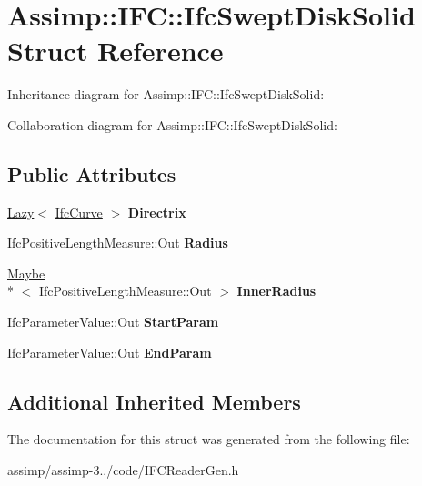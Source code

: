 \hypertarget{struct_assimp_1_1_i_f_c_1_1_ifc_swept_disk_solid}{\section{Assimp\+:\+:I\+F\+C\+:\+:Ifc\+Swept\+Disk\+Solid Struct Reference}
\label{struct_assimp_1_1_i_f_c_1_1_ifc_swept_disk_solid}
}


Inheritance diagram for Assimp\+:\+:I\+F\+C\+:\+:Ifc\+Swept\+Disk\+Solid\+:


Collaboration diagram for Assimp\+:\+:I\+F\+C\+:\+:Ifc\+Swept\+Disk\+Solid\+:
\subsection*{Public Attributes}
\begin{DoxyCompactItemize}
\item 
\hypertarget{struct_assimp_1_1_i_f_c_1_1_ifc_swept_disk_solid_a0bfd9b962ee9a2a68afcd895bb093e63}{\hyperlink{struct_assimp_1_1_s_t_e_p_1_1_lazy}{Lazy}$<$ \hyperlink{struct_assimp_1_1_i_f_c_1_1_ifc_curve}{Ifc\+Curve} $>$ {\bfseries Directrix}}\label{struct_assimp_1_1_i_f_c_1_1_ifc_swept_disk_solid_a0bfd9b962ee9a2a68afcd895bb093e63}

\item 
\hypertarget{struct_assimp_1_1_i_f_c_1_1_ifc_swept_disk_solid_ad4f0567f8095d74ecd14cc1baa3a7782}{Ifc\+Positive\+Length\+Measure\+::\+Out {\bfseries Radius}}\label{struct_assimp_1_1_i_f_c_1_1_ifc_swept_disk_solid_ad4f0567f8095d74ecd14cc1baa3a7782}

\item 
\hypertarget{struct_assimp_1_1_i_f_c_1_1_ifc_swept_disk_solid_a30ced27e12c4d569e5d13300b5253ea0}{\hyperlink{struct_assimp_1_1_s_t_e_p_1_1_maybe}{Maybe}\\*
$<$ Ifc\+Positive\+Length\+Measure\+::\+Out $>$ {\bfseries Inner\+Radius}}\label{struct_assimp_1_1_i_f_c_1_1_ifc_swept_disk_solid_a30ced27e12c4d569e5d13300b5253ea0}

\item 
\hypertarget{struct_assimp_1_1_i_f_c_1_1_ifc_swept_disk_solid_a0a949fe371d2d3763fa4ddfd08536a6e}{Ifc\+Parameter\+Value\+::\+Out {\bfseries Start\+Param}}\label{struct_assimp_1_1_i_f_c_1_1_ifc_swept_disk_solid_a0a949fe371d2d3763fa4ddfd08536a6e}

\item 
\hypertarget{struct_assimp_1_1_i_f_c_1_1_ifc_swept_disk_solid_ae06868e264f48990bc431fe585224685}{Ifc\+Parameter\+Value\+::\+Out {\bfseries End\+Param}}\label{struct_assimp_1_1_i_f_c_1_1_ifc_swept_disk_solid_ae06868e264f48990bc431fe585224685}

\end{DoxyCompactItemize}
\subsection*{Additional Inherited Members}


The documentation for this struct was generated from the following file\+:\begin{DoxyCompactItemize}
\item 
assimp/assimp-\/3../code/I\+F\+C\+Reader\+Gen.\+h\end{DoxyCompactItemize}
